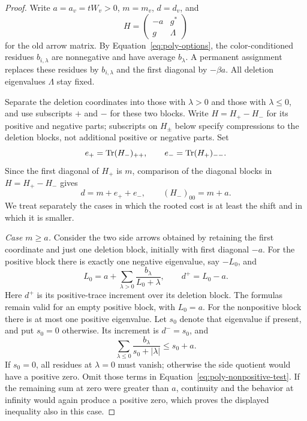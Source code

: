 \begin{proof}
Write \(a=a_v=tW_v>0\), \(m=m_v\), \(d=d_v\), and
\[
                  H=\begin{pmatrix}-a&g^*\\g&\Lambda\end{pmatrix}
\]
for the old arrow matrix.  By Equation~\eqref{eq:poly-options},
the color-conditioned residues \(b_{i,\lambda}\) are nonnegative and
have average \(b_\lambda\).  A permanent assignment replaces these
residues by \(b_{i,\lambda}\) and the first diagonal by \(-\beta a\).
All deletion eigenvalues \(\Lambda\) stay fixed.

Separate the deletion coordinates into those with \(\lambda>0\) and
those with \(\lambda\leq0\), and use subscripts \(+\) and \(-\) for these
two blocks.  Write \(H=H_+-H_-\) for its positive and negative parts;
subscripts on \(H_\pm\) below specify compressions to the deletion
blocks, not additional positive or negative parts.  Set
\[
 e_+=\operatorname{Tr}(H_-)_{++},\qquad e_-=\operatorname{Tr}(H_+)_{--}.
\]
Since the first diagonal of \(H_+\) is \(m\), comparison of the diagonal
blocks in \(H=H_+-H_-\) gives
\begin{equation}
                       d=m+e_++e_-,
              \qquad (H_-)_{00}=m+a.
 \label{eq:poly-error-decomposition}
\end{equation}
We treat separately the cases in which the rooted cost is at least
the shift and in which it is smaller.

\smallskip\noindent
\emph{Case \(m\geq a\).}
Consider the two side arrows obtained by retaining the first coordinate
and just one deletion block, initially with first diagonal \(-a\).
For the positive block there is exactly one negative eigenvalue,
say \(-L_0\), and
\[
 L_0=a+\sum_{\lambda>0}\frac{b_\lambda}{L_0+\lambda},
             \qquad d^+=L_0-a.
\]
Here \(d^+\) is its positive-trace increment over its deletion block.
The formulas remain valid for an empty positive block, with \(L_0=a\).
For the nonpositive block there is at most one positive eigenvalue.
Let \(s_0\) denote that eigenvalue if present, and put \(s_0=0\)
otherwise.  Its increment is \(d^-=s_0\), and
\begin{equation}
             \sum_{\lambda\leq0}\frac{b_\lambda}{s_0+|\lambda|}
                              \leq s_0+a.
 \label{eq:poly-nonpositive-test}
\end{equation}
If \(s_0=0\), all residues at \(\lambda=0\) must vanish; otherwise the
side quotient would have a positive zero.  Omit those terms in
Equation~\eqref{eq:poly-nonpositive-test}.  If the remaining sum at zero
were greater than \(a\), continuity and the behavior at infinity would
again produce a positive zero, which proves the displayed inequality
also in this case.


\end{proof}
